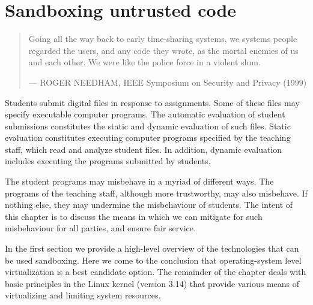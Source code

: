 
\chapter{Sandboxing untrusted code}

\begin{quotation}

\footnotesize\sffamily\itshape

\begin{flushright}

Going all the way back to early time-sharing systems, we systems people
regarded the users, and any code they wrote, as the mortal enemies of us and
each other. We were like the police force in a violent slum.

\smallbreak

\upshape

--- ROGER NEEDHAM, IEEE Symposium on Security and Privacy (1999)

\end{flushright}

\end{quotation}

Students submit digital files in response to assignments. Some of these files
may specify executable computer programs. The automatic evaluation of student
submissions constitutes the static and dynamic evaluation of such files. Static
evaluation constitutes executing computer programs specified by the teaching
staff, which read and analyze student files. In addition, dynamic evaluation
includes executing the programs submitted by students.

The student programs may misbehave in a myriad of different ways. The programs
of the teaching staff, although more trustworthy, may also misbehave. If
nothing else, they may undermine the misbehaviour of students. The intent of
this chapter is to discuss the means in which we can mitigate for such
misbehaviour for all parties, and ensure fair service.

In the first section we provide a high-level overview of the technologies that
can be used sandboxing. Here we come to the conclusion that operating-system
level virtualization is a best candidate option. The remainder of the chapter
deals with basic principles in the Linux kernel (version 3.14) that provide
various means of virtualizing and limiting system resources.













